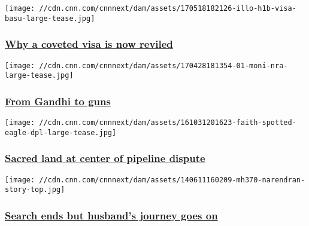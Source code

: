 \href{/2017/06/04/us/understanding-the-h-1b-visa/index.html}{}

\texttt{[image: //cdn.cnn.com/cnnnext/dam/assets/170518182126-illo-h1b-visa-basu-large-tease.jpg]}

\hypertarget{why-a-coveted-visa-is-now-reviled}{%
\subsubsection{\texorpdfstring{\href{/2017/06/04/us/understanding-the-h-1b-visa/index.html}{Why
a coveted visa is now
reviled}}{Why a coveted visa is now reviled}}\label{why-a-coveted-visa-is-now-reviled}}

\href{/2017/04/28/world/indian-immigrant-nra-convention/index.html}{}

\texttt{[image: //cdn.cnn.com/cnnnext/dam/assets/170428181354-01-moni-nra-large-tease.jpg]}

\hypertarget{from-gandhi-to-guns}{%
\subsubsection{\texorpdfstring{\href{/2017/04/28/world/indian-immigrant-nra-convention/index.html}{From
Gandhi to guns}}{From Gandhi to guns}}\label{from-gandhi-to-guns}}

\href{/2016/11/01/us/standing-rock-sioux-sacred-land-dakota-pipeline/index.html}{}

\texttt{[image: //cdn.cnn.com/cnnnext/dam/assets/161031201623-faith-spotted-eagle-dpl-large-tease.jpg]}

\hypertarget{sacred-land-at-center-of-pipeline-dispute-}{%
\subsubsection{\texorpdfstring{\href{/2016/11/01/us/standing-rock-sioux-sacred-land-dakota-pipeline/index.html}{Sacred
land at center of pipeline dispute
}}{Sacred land at center of pipeline dispute }}\label{sacred-land-at-center-of-pipeline-dispute-}}

\href{/2017/01/22/world/mh370-husband-speaks-out/index.html}{}

\texttt{[image: //cdn.cnn.com/cnnnext/dam/assets/140611160209-mh370-narendran-story-top.jpg]}

\hypertarget{search-ends-but-husbands-journey-goes-on}{%
\subsubsection{\texorpdfstring{\href{/2017/01/22/world/mh370-husband-speaks-out/index.html}{Search
ends but husband's journey goes
on}}{Search ends but husband's journey goes on}}\label{search-ends-but-husbands-journey-goes-on}}

